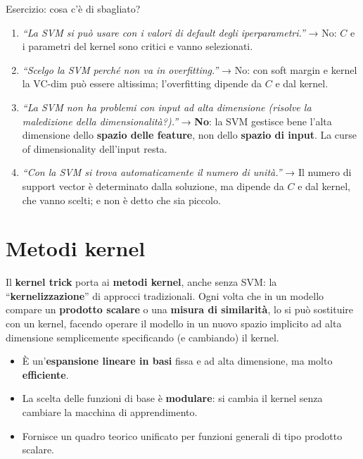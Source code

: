 \begin{boxquestion}{Esercizio: cosa c'è di sbagliato?}

\begin{enumerate}
\def\labelenumi{\arabic{enumi}.}
\tightlist
\item
  \emph{``La SVM si può usare con i valori di default degli
  iperparametri.''} → No: \(C\) e i parametri del kernel sono critici e
  vanno selezionati.
\item
  \emph{``Scelgo la SVM perché non va in overfitting.''} → No: con soft
  margin e kernel la VC-dim può essere altissima; l'overfitting dipende
  da \(C\) e dal kernel.
\item
  \emph{``La SVM non ha problemi con input ad alta dimensione (risolve
  la maledizione della dimensionalità?).''} → \textbf{No}: la SVM
  gestisce bene l'alta dimensione dello \textbf{spazio delle feature},
  non dello \textbf{spazio di input}. La curse of dimensionality
  dell'input resta.
\item
  \emph{``Con la SVM si trova automaticamente il numero di unità.''} →
  Il numero di support vector è determinato dalla soluzione, ma dipende
  da \(C\) e dal kernel, che vanno scelti; e non è detto che sia
  piccolo.
\end{enumerate}

\end{boxquestion}

\section{Metodi kernel}\label{metodi-kernel}

Il \textbf{kernel trick} porta ai \textbf{metodi kernel}, anche senza
SVM: la ``\textbf{kernelizzazione}'' di approcci tradizionali. Ogni
volta che in un modello compare un \textbf{prodotto scalare} o una
\textbf{misura di similarità}, lo si può sostituire con un kernel,
facendo operare il modello in un nuovo spazio implicito ad alta
dimensione semplicemente specificando (e cambiando) il kernel.

\begin{itemize}
\tightlist
\item
  È un'\textbf{espansione lineare in basi} fissa e ad alta dimensione,
  ma molto \textbf{efficiente}.
\item
  La scelta delle funzioni di base è \textbf{modulare}: si cambia il
  kernel senza cambiare la macchina di apprendimento.
\item
  Fornisce un quadro teorico unificato per funzioni generali di tipo
  prodotto scalare.
\end{itemize}

